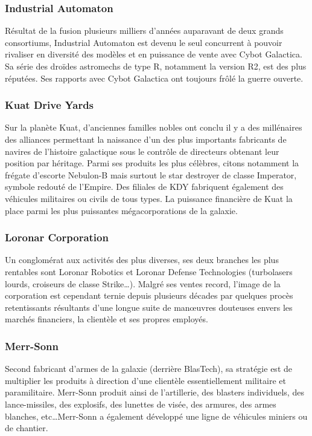 \documentclass[twoside]{article}
\begin{document}
\subsubsection{Industrial Automaton}
Résultat de la fusion plusieurs milliers d'années auparavant de deux grands consortiums, Industrial Automaton est devenu le seul concurrent à pouvoir rivaliser en diversité des modèles et en puissance de vente avec Cybot Galactica. Sa série des droïdes astromechs de type R, notamment la version R2, est des plus réputées. Ses rapports avec Cybot Galactica ont toujours frôlé la guerre ouverte.

\subsubsection{Kuat Drive Yards}
Sur la planète Kuat, d'anciennes familles nobles ont conclu il y a des millénaires des alliances permettant la naissance d'un des plus importants fabricants de navires de l'histoire galactique sous le contrôle de directeurs obtenant leur position par héritage. Parmi ses produits les plus célèbres, citons notamment la frégate d'escorte Nebulon-B mais surtout le star destroyer de classe Imperator, symbole redouté de l'Empire. Des filiales de KDY fabriquent également des véhicules militaires ou civils de tous types. La puissance financière de Kuat la place parmi les plus puissantes mégacorporations de la galaxie.

\subsubsection{Loronar Corporation}
Un conglomérat aux activités des plus diverses, ses deux branches les plus rentables sont Loronar Robotics et Loronar Defense Technologies (turbolasers lourds, croiseurs de classe Strike\ldots). Malgré ses ventes record, l'image de la corporation est cependant ternie depuis plusieurs décades par quelques procès retentissants résultants d'une longue suite de manœuvres douteuses envers les marchés financiers, la clientèle et ses propres employés.

\subsubsection{Merr-Sonn}
Second fabricant d'armes de la galaxie (derrière BlasTech), sa stratégie est de multiplier les produits à direction d'une clientèle essentiellement militaire et paramilitaire. Merr-Sonn produit ainsi de l'artillerie, des blasters individuels, des lance-missiles, des explosifs, des lunettes de visée, des armures, des armes blanches, etc\ldots Merr-Sonn a également développé une ligne de véhicules miniers ou de chantier.
\end{document}
